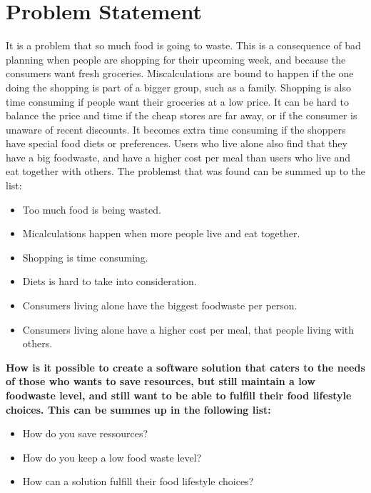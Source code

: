 \chapter{Problem Statement}
It is a problem that so much food is going to waste. This is a consequence of bad planning when people are shopping for their upcoming week, and because the consumers want fresh groceries. Miscalculations are bound to happen if the one doing the shopping is part of a bigger group, such as a family. Shopping is also time consuming if people want their groceries at a low price. It can be hard to balance the price and time if the cheap stores are far away, or if the consumer is unaware of recent discounts. It becomes extra time consuming if the shoppers have special food diets or preferences. Users who live alone also find that they have a big foodwaste, and have a higher cost per meal than users who live and eat together with others. The problemst that was found can be summed up to the list:

\begin{itemize}
    \item Too much food is being wasted.
    \item Micalculations happen when more people live and eat together.
    \item Shopping is time consuming.
    \item Diets is hard to take into consideration.
    \item Consumers living alone have the biggest foodwaste per person.
    \item Consumers living alone have a higher cost per meal, that people living with others.
\end{itemize}

\textbf{How is it possible to create a software solution that caters to the needs of those who wants to save resources, but still maintain a low foodwaste level, and still want to be able to fulfill their food lifestyle choices. This can be summes up in the following list:}

\begin{itemize}
	\item How do you save ressources?
	\item How do you keep a low food waste level?
	\item How can a solution fulfill their food lifestyle choices?
\end{itemize}


